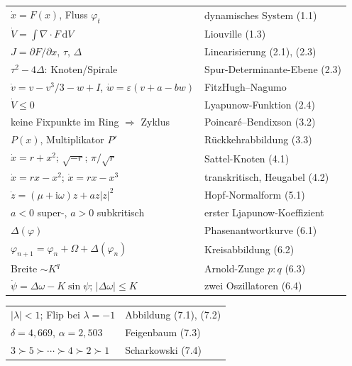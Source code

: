 \begin{merksatz}
\begin{center}
{\small
\renewcommand{\arraystretch}{1.6}
\begin{tabular}{@{}P{4.6cm}P{4.0cm}@{}}
\toprule
$\dot x = F(x)$, Fluss $\varphi_t$ & dynamisches System (1.1)\\
$\dot V = \int\nabla\!\cdot\!F\,\mathrm dV$ & Liouville (1.3)\\
$J = \partial F/\partial x$, $\tau$, $\Delta$ & Linearisierung (2.1), (2.3)\\
$\tau^{2} - 4\Delta$: Knoten/Spirale & Spur-Determinante-Ebene (2.3)\\
$\dot v = v - v^{3}/3 - w + I$, $\dot w = \varepsilon(v + a - bw)$ & FitzHugh--Nagumo\\
$\dot V \le 0$ & Lyapunow-Funktion (2.4)\\
keine Fixpunkte im Ring $\Rightarrow$ Zyklus & Poincaré--Bendixson (3.2)\\
$P(x)$, Multiplikator $P'$ & Rückkehrabbildung (3.3)\\
$\dot x = r + x^{2}$; $\sqrt{-r}$; $\pi/\sqrt r$ & Sattel-Knoten (4.1)\\
$\dot x = rx - x^{2}$; $\dot x = rx - x^{3}$ & transkritisch, Heugabel (4.2)\\
$\dot z = (\mu + \mathrm i\omega)z + a z|z|^{2}$ & Hopf-Normalform (5.1)\\
$a < 0$ super-, $a > 0$ subkritisch & erster Ljapunow-Koeffizient\\
$\Delta(\varphi)$ & Phasenantwortkurve (6.1)\\
$\varphi_{n+1} = \varphi_n + \Omega + \Delta(\varphi_n)$ & Kreisabbildung (6.2)\\
Breite $\sim K^{q}$ & Arnold-Zunge $p\!:\!q$ (6.3)\\
$\dot\psi = \Delta\omega - K\sin\psi$; $|\Delta\omega| \le K$ & zwei Oszillatoren (6.4)\\
\bottomrule
\end{tabular}}
\end{center}
\begin{center}
{\small
\renewcommand{\arraystretch}{1.6}
\begin{tabular}{@{}P{4.6cm}P{4.0cm}@{}}
\toprule
$|\lambda| < 1$; Flip bei $\lambda = -1$ & Abbildung (7.1), (7.2)\\
$\delta = 4{,}669$, $\alpha = 2{,}503$ & Feigenbaum (7.3)\\
$3 \succ 5 \succ \cdots \succ 4 \succ 2 \succ 1$ & Scharkowski (7.4)\\

\end{tabular}}
\end{center}
\end{merksatz}
